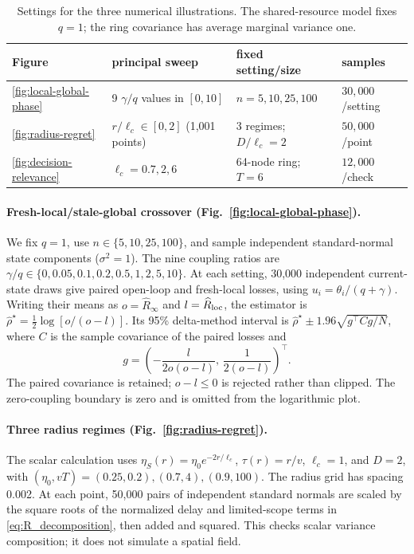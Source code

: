 \begin{table}[H]
\centering
\caption{Settings for the three numerical illustrations. The shared-resource
model fixes $q=1$; the ring covariance has average marginal variance one.}
\label{tab:numerical-parameters}
\small
\begin{tabular}{llll}
\toprule
Figure & principal sweep & fixed setting/size & samples \\
\midrule
\ref{fig:local-global-phase} & 9 $\gamma/q$ values in $[0,10]$ & $n=5,10,25,100$ & $30{,}000$/setting \\
\ref{fig:radius-regret} & $r/\ell_c\in[0,2]$ (1,001 points) & 3 regimes; $D/\ell_c=2$ & $50{,}000$/point \\
\ref{fig:decision-relevance} & $\ell_c=0.7,2,6$ & 64-node ring; $T=6$ & $12{,}000$/check \\
\bottomrule
\end{tabular}
\end{table}

\paragraph{Fresh-local/stale-global crossover (Fig.~\ref{fig:local-global-phase}).}
We fix $q=1$, use $n\in\{5,10,25,100\}$, and sample independent
standard-normal state components ($\sigma^2=1$).
The nine coupling ratios are $\gamma/q\in\{0,0.05,0.1,0.2,0.5,1,2,5,10\}$.
At each setting, 30,000 independent current-state draws give paired open-loop and fresh-local
losses, using $u_i=\theta_i/(q+\gamma)$.
Writing their means as $o=\widehat R_\infty$ and
$l=\widehat R_{\rm loc}$, the estimator is
$\widehat\rho^\star=\tfrac12\log[o/(o-l)]$.
Its 95\% delta-method interval is
$\widehat\rho^\star\pm1.96\sqrt{g^\top Cg/N}$, where $C$ is the sample
covariance of the paired losses and
\[
g=\left(-\frac{l}{2o(o-l)},\,\frac{1}{2(o-l)}\right)^\top.
\]
The paired covariance is retained; $o-l\le0$ is rejected rather than clipped.
The zero-coupling boundary is zero and is omitted from the logarithmic plot.

\paragraph{Three radius regimes (Fig.~\ref{fig:radius-regret}).}
The scalar calculation uses $\eta_S(r)=\eta_0e^{-2r/\ell_c}$,
$\tau(r)=r/v$, $\ell_c=1$, and $D=2$, with
$(\eta_0,vT)=(0.25,0.2),(0.7,4),(0.9,100)$.
The radius grid has spacing 0.002. At each point, 50,000 pairs of independent
standard normals are scaled by the square roots of the normalized delay and limited-scope terms in
\eqref{eq:R_decomposition}, then added
and squared. This checks scalar variance composition; it does not simulate
a spatial field.

